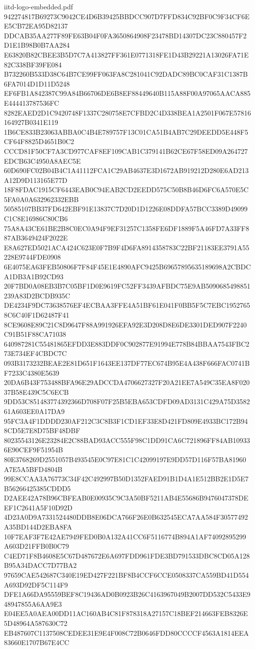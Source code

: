 \begin{filecontents*}[overwrite]{iitd-logo-embedded.pdf}
942274817B69273C9042CE4D6B39425BBDCC907D7FFD834C92BF0C9F34CF6EE5CB72EA95D82137
DDCAB35AA277F89FE63B04F0FA3650864908F23478BD14307DC23C880457F2D1E1B98B0B7AA284
E63820B82CBEE3B5D7C7A413827FF361E0771318FE1D43B29221A13026FA71E82C338BF39FE084
B732260B533D38C64B7CE99FF063FA8C281041C92DADC89BC0CAF31C1387B6FA7014D1D11D5248
EF6FB1A842387C99A84B66706DE6B8EF88449640B115A88F00A97065AACA885E444413787536FC
8282EAED2D1C9420748F1337C280758E7CFBD2C4D338BEA1A2501F067E57816164927B0341E119
1B6CE833B23063ABBA0C4B4E789757F13C01CA51B4AB7C29DEEDD5E448F5CF64F8825D4651B0C2
CCCD81F50CF7A3CD977CAF8EF109CAB1C379141B62CE67F58ED09A264727EDCB63C4950A8AEC5E
60D690FC02B04B4C1A41112FCA1C29AB4637E3D1672AB919212D280E6AD213A12D9D113165E77D
18F8FDAC1915CF6443EAB0C94EAB2CD2EEDD575C50B8B46D6FC6A570E5C5FA0A0A632962332EBB
50585107BB37FD642EBF91E13837C7D20D1D1226E08DDFA57BCC3389D49099C1C8E16986C80CB6
75A8A43CE61BE2B8C0EC0A94F9EF31257C1358FE6DF1889F5A46FD7A33FF887AB3649424F2022E
E8A627ED5021ACA424C623E0F7B9F4D6FA8914358783C22BF21183EE3791A55228E9744FDE0908
6E4075EA63FEB50806F7F84F45E1E4890AFC9425B69657895635189698A2CBDCA1DB3A1B92CD93
20F7BD0A08EB3B7C05BF1D0E9619FC52FF3439AFBDC75E9AB5090685498851239A83D2BCDB935C
DE4234F9DC73638576EF4ECBAA3FFE4A51BF61E041F0BB5F5C7EBC19527658C6C40F1D62487F41
8CE9608E89C21C8D9647F88A991926EFA92E3D208D8E6DE3301DED907F2240C91B51F88CA71038
640987281C55481865EFDD3E883DDF0C902877E91994E778B84BBAA7543FBC273E734EF4CBDC7C
093B3173232BEAE2E81D651F1643EE137DF77EC674B95E4A438F666FAC0741BF7233C4380E5639
20DA6B43F753488BFA96E29ADCCDA4706627327F20A21EE7A549C35EA8F02037B58E439C5C6ECB
9DD53C851483774392366D708F07F25B5EBA653CDFD09AD3131C429A75D358261A603EE0A17DA9
95FC3A4F1DDDD230AF212C3C8B3F1CD1EF33E8D421FD809E4933BC172B948CD5E7E8D75BF48DBF
80235543126E23284E2C88BAD93ACC555F98C1DD91CA6C721896FF84AB109336E90CEF9F51954B
80E3768269D2551057B493545E0C97E81C1C42099197E9DD57D116F57BA81960A7E5A5BFD4804B
99E8CCAA3A76773C34F42C492997B50D1352FAED91B1D4A1E512BB2E1D5E7B56266425385CDDD5
D2AEE42A78B96CBFEAB0E00935C9C3A50BF5211AB4E55686B9476047378DEEF1C2641A5F10D92D
4D23A0D9A7331524480DDB8E06DCA766F26E0B632545ECA7AA584F30577492A35BD144D2EBA8FA
10F7EAF3F7E42AE7949FED0B0A132A41CC6F5116774B894A1AF74092895299A603D21FFB0B0C79
C4ED71F8B4608E5C67D487672E6A697FDD961FDE3BD791533DBC8CD05A128B95A34DACC7D77BA2
97659CAE542687C340E19ED427F221BF8B4CCF6CCE0508337CA559BD41D554A693D92DF5C114F9
DFE1A66DA95559BEF8C19436AD0B0923B26C4163967049B2007DD532C5433E948947855A6AA9E3
E04EE5A0AEA00DD11AC160AB4C81F878318A27157C18BEF214663FEB8326E5D48964A587630C72
EB487607C1137508CEDEE31E9E4F008C72B0646FDD80CCCCF4563A1814EEA83660E1707B67E4CC

\end{filecontents*}
